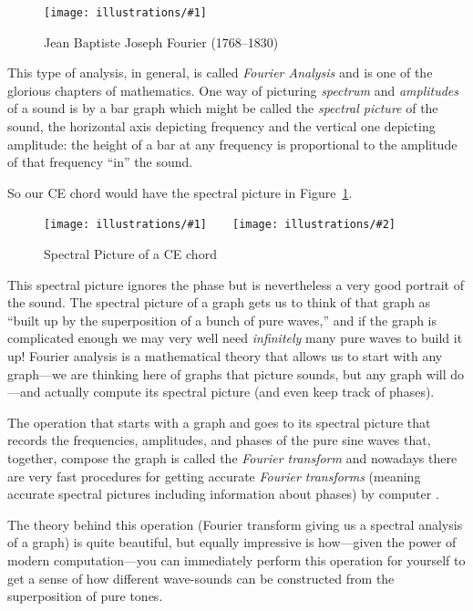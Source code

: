\documentclass[openany]{book}
\newcommand{\ill}[3]{%
   \begin{figure}[H]%
   \vspace{-2ex}
   \centering%
   \texttt{[image: illustrations/\#1]}%
   \caption{#3}%
   \vspace{-2ex}
    \end{figure}}
\newcommand{\illtwo}[4]{%
   \begin{figure}[H]\centering%
   \texttt{[image: illustrations/\#1]}$\qquad$\texttt{[image: illustrations/\#2]}%
   \caption{#4}%
    \end{figure}}
\theoremstyle{plain}
\theoremstyle{definition}
\begin{document}
{{\ill{fourier}{0.3}{Jean Baptiste Joseph Fourier (1768--1830)}

This type of analysis, in general, is called {\em Fourier Analysis}
and is one of the glorious chapters of mathematics.  One way of
picturing {\em spectrum} and {\em amplitudes} of a sound is by a bar
graph which might be called the {\em spectral picture} of the sound,
the horizontal axis depicting frequency and the vertical one depicting
amplitude: the height of a bar at any frequency is proportional to the
amplitude of that frequency ``in'' the sound.

So our CE chord would have the spectral picture in
Figure~\ref{fig:ce-spectral}.


\illtwo{sound-ce-general_sum}{sound-ce-general_sum-blips}{.4}
       {Spectral Picture of a CE chord\label{fig:ce-spectral}}


This spectral picture ignores the phase but is nevertheless a very
good portrait of the sound.  The spectral picture of a graph gets us
to think of that graph as ``built up by the superposition of a bunch
of pure waves,'' and if the graph is complicated enough we may very well
need {\em infinitely} many pure waves to build it up!  Fourier analysis is a
mathematical theory that allows us to start with any graph---we are
thinking here of graphs that picture sounds, but any graph will
do---and actually compute its spectral picture (and even keep track of
phases).


The operation that starts with a graph and goes to its spectral
picture that records the frequencies, amplitudes, and phases of the
pure sine waves that, together, compose the graph is called the {\em
  Fourier transform} and nowadays there are very fast procedures for
getting accurate {\em Fourier transforms} (meaning accurate spectral
pictures including information about phases) by
computer .


The theory behind this operation (Fourier transform giving
us a spectral analysis of a graph) is quite beautiful, but equally
impressive is how---given the power of modern computation---you can
immediately perform this operation for yourself to get a sense of how
different wave-sounds can be constructed from the superposition of
pure tones.

}}
\end{document}
